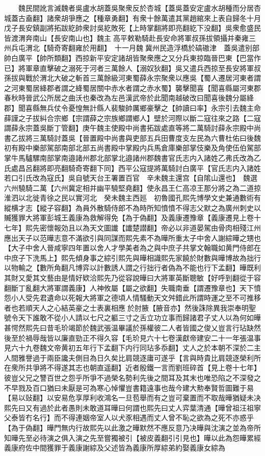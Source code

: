 　　魏民間訛言滅魏者吳盧水胡蓋吳聚衆反於杏城【蓋吳蓋安定盧水胡種而分居杏城蓋古盍翻】諸衆胡爭應之【種章勇翻】有衆十餘萬遣其黨趙綰來上表自歸冬十月戊子長安鎮副將拓跋紇帥衆討吳紇敗死【上時掌翻將即亮翻紇下没翻】吳衆愈盛民皆渡渭奔南山【長安南山也】魏主高平敕勒騎赴長安命將軍叔孫拔領攝并秦雍三州兵屯渭北【騎奇寄翻雍於用翻】　十一月魏冀州民造浮橋於碻磝津　蓋吳遣别部帥白廣平【帥所類翻】西掠新平安定諸胡皆聚衆應之又分兵東掠臨晉巴東【巴當作已】將軍章直擊破之溺死于河者三萬餘人【溺奴狄翻】吳又遣兵西掠至長安將軍叔孫拔與戰於渭北大破之斬首三萬餘級河東蜀薛永宗聚衆以應吳【蜀人遷居河東者謂之河東蜀居絳郡者謂之絳蜀居關中赤水者謂之赤水蜀】襲擊聞喜【聞喜縣屬河東郡春秋時晉武公所居之曲沃也秦改為左邑漢武帝於此聞南越破改曰聞喜後魏分屬絳郡】聞喜縣無兵仗令憂惶無計縣人裴駿帥厲鄉豪擊之【帥讀曰率】永宗引去魏主命薛謹之子拔糾合宗鄉【宗謂薛之宗族鄉謂鄉人】壁於河際以斷二寇往來之路【二寇謂薛永宗蓋吳斷丁管翻】庚午魏主使殿中尚書拓跋處直等將二萬騎討薛永宗殿中尚書乙拔將三萬騎討蓋吳【晉置殿中尚書與吏部五兵田曹度支左民為六曹杜佑曰後魏初有殿中樂部駕部南部北部五尚書殿中掌殿内兵馬倉庫樂部掌伎樂及角使伍伯駕部掌牛馬驢騾南部掌南邉諸州郡北部掌北邉諸州郡魏書官氏志内入諸姓乙弗氏改為乙氏處昌呂翻將即亮翻騎奇寄翻下同】西平公寇提將萬騎討白廣平【官氏志内入諸姓若口引氏改為寇氏】吳自號天台王署置百官　辛未魏主還宫【自隂山還也】　魏選六州驍騎二萬【六州冀定相并幽平驍堅堯翻】使永昌王仁高凉王那分將之為二道掠淮泗以北徙青徐之民以實河北　癸未魏主西廵　初魯國孔熙先博學文史兼通數術有縱横才志【縱子容翻】為員外散騎侍郎不為時所知憤憤不得志父默之為廣州刺史以贓獲罪大將軍彭城王義康為救解得免【為于偽翻】及義康遷豫章【義康遷見上卷十七年】熙先密懷報効且以為天文圖䜟【䜟楚譛翻】帝必以非道晏駕由骨肉相殘江州應出天子以范曄志意不滿欲引與同謀而熙先素不為曄所重太子中舍人謝綜曄之甥也【大子中舍人晉咸寧四年置以舍人才學美者為之與中庶子共掌文翰職如黄門侍郎在中庶子下洗馬上】熙先傾身事之綜引熙先與曄相識熙先家饒於財數與曄博故為拙行以物輸之【數所角翻凡博弈以計數誘人謂之行拙行者偽為不能也行下孟翻】曄既利其財又愛其文藝由是情好欵洽熙先乃從容說曄曰大將軍英斷聰敏【好呼到翻從于容翻斷丁亂翻大將軍謂義康】人神攸屬【屬之欲翻】失職南垂【謂遷豫章也】天下憤怨小人受先君遺命以死報大將軍之德頃人情騷動天文舛錯此所謂時運之至不可推移者也若順天人之心結英豪之士表裏相應於肘腋【腋音亦】然後誅除異我崇奉明聖號令天下誰敢不從小人請以七尺之軀三寸之舌立功立事而歸諸君子丈人以為何如曄甚愕然熙先曰昔毛玠竭節於魏武張温畢議於孫權彼二人者皆國之俊乂豈言行玷缺然後至於禍辱哉皆以廉直勁正不得久容【毛玠見六十七卷漢獻帝建安二十一年張温事見六十九卷魏文帝黄初五年行下孟翻下内行同玷多忝翻】丈人之於本朝不深於二主人間雅譽過于兩臣讒夫側目為日久矣比肩競逐庸可遂乎【言與時貴比肩競逐榮利所在衆所共爭將不得遂其志也朝直遥翻】近者殷鐵一言而劉班碎首【見上卷十七年】彼豈父兄之讐百世之怨乎所爭不過榮名勢利先後之間耳及其末也唯恐陷之不深發之不早戮及百口猶曰未厭是可為寒心悼懼豈書籍遠事也哉今建大勲奉賢哲圖難于易【易以䜴翻】以安易危享厚利收鴻名一旦苞舉而有之豈可棄置而不取哉曄猶疑未决熙先曰又有過於此者愚則未敢道耳曄曰何謂也熙先曰丈人弈葉清通【曄曾祖汪祖寧父泰皆冇名行】而不得連姻帝室人以犬豕相遇而丈人曾不恥之欲為之死不亦惑乎【為于偽翻】曄門無内行故熙先以此激之曄默然不應反意乃决曄與沈演之並為帝所知曄先至必待演之俱入演之先至嘗獨被引【被皮義翻引引見也】曄以此為怨曄累經義康府佐中間獲罪于義康謝綜及父述皆為義康所厚綜弟約娶義康女綜為